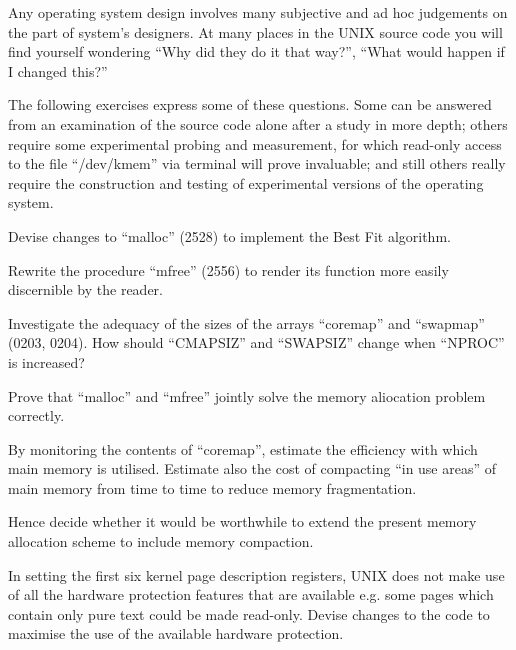 %
%

Any operating system design involves
many subjective and ad hoc judgements
on the part of system's designers. At
many places in the UNIX source code
you will find yourself wondering ``Why
did they do it that way?'', ``What would
happen if I changed this?''

The following exercises express some of
these questions. Some can be answered
from an examination of the source code
alone after a study in more depth; others require some experimental probing
and measurement, for which read-only
access to the file ``/dev/kmem'' via terminal will prove invaluable; and still
others really require the construction
and testing of experimental versions of
the operating system.


\bd
\item[1.1] Devise changes to ``malloc'' (2528)
to implement the Best Fit algorithm.

\item[1.2] Rewrite the procedure ``mfree''
(2556) to render its function more
easily discernible by the reader.

\item[1.3] Investigate the adequacy of the
sizes of the arrays ``coremap'' and
``swapmap'' (0203, 0204).   How should
``CMAPSIZ'' and ``SWAPSIZ'' change when
``NPROC'' is increased?

\item[1.4] Prove that ``malloc'' and ``mfree''
jointly solve the memory aliocation
problem correctly.

\item[1.5] By monitoring the contents of
``coremap'', estimate the efficiency with
which main memory is utilised. Estimate also the cost of compacting ``in
use areas'' of main memory from time to
time to reduce memory fragmentation.

Hence decide whether it would be
worthwhile to extend the present memory
allocation scheme to include memory
compaction.

\item[1.6] In setting the first six kernel
page description registers, UNIX does
not make use of all the hardware protection features that are available
e.g. some pages which contain only pure
text could be made read-only. Devise
changes to the code to maximise the use
of the available hardware protection.

